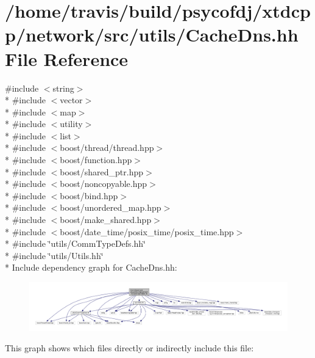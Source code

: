 \hypertarget{CacheDns_8hh}{\section{/home/travis/build/psycofdj/xtdcpp/network/src/utils/\-Cache\-Dns.hh File Reference}
\label{CacheDns_8hh}
}
{\ttfamily \#include $<$string$>$}\\*
{\ttfamily \#include $<$vector$>$}\\*
{\ttfamily \#include $<$map$>$}\\*
{\ttfamily \#include $<$utility$>$}\\*
{\ttfamily \#include $<$list$>$}\\*
{\ttfamily \#include $<$boost/thread/thread.\-hpp$>$}\\*
{\ttfamily \#include $<$boost/function.\-hpp$>$}\\*
{\ttfamily \#include $<$boost/shared\-\_\-ptr.\-hpp$>$}\\*
{\ttfamily \#include $<$boost/noncopyable.\-hpp$>$}\\*
{\ttfamily \#include $<$boost/bind.\-hpp$>$}\\*
{\ttfamily \#include $<$boost/unordered\-\_\-map.\-hpp$>$}\\*
{\ttfamily \#include $<$boost/make\-\_\-shared.\-hpp$>$}\\*
{\ttfamily \#include $<$boost/date\-\_\-time/posix\-\_\-time/posix\-\_\-time.\-hpp$>$}\\*
{\ttfamily \#include \char`\"{}utils/\-Comm\-Type\-Defs.\-hh\char`\"{}}\\*
{\ttfamily \#include \char`\"{}utils/\-Utils.\-hh\char`\"{}}\\*
Include dependency graph for Cache\-Dns.\-hh\-:
\nopagebreak
\begin{figure}[H]
\begin{center}
\leavevmode
\includegraphics[width=350pt]{CacheDns_8hh__incl}
\end{center}
\end{figure}
This graph shows which files directly or indirectly include this file\-:
\nopagebreak
